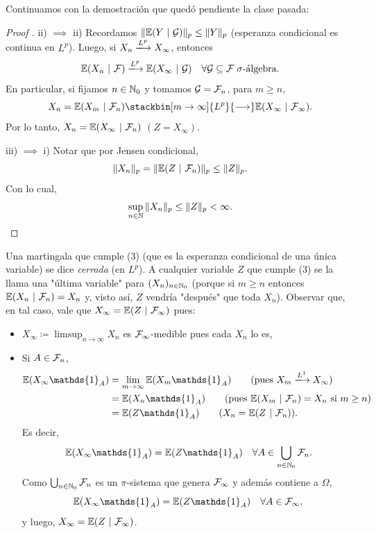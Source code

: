 
Continuamos con la demostración que quedó pendiente la clase pasada:

\begin{proof}[Proof ]
	ii) $\implies$ ii) Recordamos $\| \mathbb{E}(Y \ | \ \mathcal{G}) \|_{p} \leq \| Y \|_{p}$ (esperanza condicional es continua en $L^{p}$). Luego, si $X_{n} \xlongrightarrow{L^{p}} X_{\infty}$, entonces
	\[ \mbb{E}(X_{n} \ | \ \mcal{F}) \xlongrightarrow{L^{p}} \mbb{E}(X_{\infty} \ | \ \mcal{G}) \quad \forall \mcal{G} \subseteq \mcal{F} \; \sigma\text{-álgebra}. \]
	En particular, si fijamos $n \in \mathbb{N}_{0}$ y tomamos $\mathcal{G} = \mathcal{F}_{n}$, para $m \geq n$,
	\[ X_{n} = \mbb{E}(X_{m} \ | \ \mcal{F}_{n}) \stackbin[m \to \infty]{L^{p}}{\longrightarrow} \mbb{E}(X_{\infty} \ | \ \mcal{F}_{\infty}). \]
	Por lo tanto, $X_{n} = \mbb{E}(X_{\infty} \ | \ \mcal{F}_{n})$ $(Z = X_{\infty})$. \par
	iii) $\implies$ i) Notar que por Jensen condicional,
	\[ \| X_{n} \|_{p} = \| \mathbb{E}(Z \ | \ \mathcal{F}_{n}) \|_{p} \leq \| Z \|_{p}. \]
	Con lo cual, 
	\[ \sup_{n \in \mathbb{N}} \| X_{n} \|_{p} \leq \| Z \|_{p} < \infty. \]
\end{proof}

\begin{comentarios}
	Una martingala que cumple (3) (que es la esperanza condicional de una única variable) se dice \textit{cerrada} (en $L^{p}$). A cualquier variable $Z$ que cumple (3) se la llama una "última variable" para $(X_{n})_{n \in \mathbb{N}_{0}}$ (porque si $m \geq n$ entonces $\mathbb{E}(X_{n} \ | \ \mathcal{F}_{n}) = X_{n}$ y, visto así, $Z$ vendría "después" que toda $X_{n}$). Observar que, en tal caso, vale que $X_{\infty} = \mbb{E}(Z \ | \ \mcal{F}_{\infty})$ pues:
	\begin{itemize}
		\item $X_{\infty} \coloneq \limsup_{n \to \infty} X_{n}$ es $\mathcal{F}_{\infty}$-medible pues cada $X_{n}$ lo es,

		\item Si $A \in \mathcal{F}_{n}$, 
		\begin{align*}
			\mbb{E}(X_{\infty} \mathds{1}_{A}) &= \lim_{m \to \infty} \mbb{E}(X_{m} \mathds{1}_{A}) \tag{pues $X_{m} \xlongrightarrow{L^{1}} X_{\infty}$}\\
			&= \mbb{E}(X_{n} \mathds{1}_{A}) \tag{pues $\mbb{E}(X_{m} \ | \ \mcal{F}_{n}) = X_{n}$ si $m \geq n$} \\
			&= \mbb{E}(Z \mathds{1}_{A}) \tag{$X_{n} = \mbb{E}(Z \ | \ \mcal{F}_{n})$}
		.\end{align*}
		Es decir,
		\[ \mbb{E}(X_{\infty} \mathds{1}_{A}) = \mbb{E}(Z \mathds{1}_{A}) \quad \forall A \in \bigcup_{n \in \N_{0}} \mcal{F}_{n}. \]
		Como $\bigcup_{n \in \mathbb{N}_{0}} \mathcal{F}_{n}$ es un $\pi$-sistema que genera $\mathcal{F}_{\infty}$ y además contiene a $\Omega$,
		\[ \mbb{E}(X_{\infty} \mathds{1}_{A}) = \mbb{E}(Z \mathds{1}_{A}) \quad \forall A \in \mcal{F}_{\infty}, \]
		y luego, $X_{\infty} = \mbb{E}(Z \ | \ \mcal{F}_{\infty})$.
	\end{itemize}
\end{comentarios}

